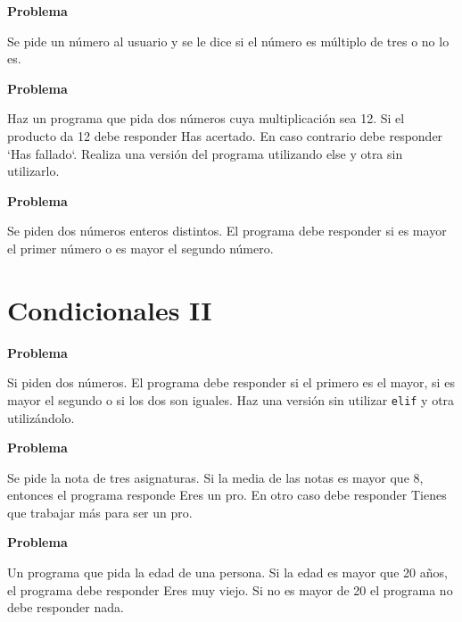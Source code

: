 \documentclass[a4paper, 11pt]{scrartcl}
\begin{document}
\noindent\textbf{\sffamily Problema}

Se pide un número al usuario y se le dice si el número es múltiplo de tres o no lo es.







\noindent\textbf{\sffamily Problema}

Haz un programa que pida dos números cuya multiplicación sea 12. Si el producto da 12 debe responder \guillemotleft Has acertado\guillemotright. En caso contrario debe responder `Has fallado`. Realiza una versión del programa utilizando \guillemotleft else\guillemotright{}  y otra sin utilizarlo.






\noindent\textbf{\sffamily Problema}

Se piden dos números enteros distintos. El programa debe responder si es mayor el primer número o es mayor el segundo número.


\newpage

\section{Condicionales II}





\noindent\textbf{\sffamily Problema}


Si piden dos números. El programa debe responder si el primero es el mayor, si es mayor el segundo o si los dos son iguales. Haz una versión sin utilizar \verb|elif| y otra utilizándolo.






\noindent\textbf{\sffamily Problema}

Se pide la nota de tres asignaturas. Si la media de las notas es mayor que 8, entonces el programa responde \guillemotleft Eres un pro\guillemotright. En otro caso debe responder \guillemotleft Tienes que trabajar más para ser un pro\guillemotright.






\noindent\textbf{\sffamily Problema}

Un programa que pida la edad de una persona. Si la edad es mayor que 20 años, el programa debe responder \guillemotleft Eres muy viejo\guillemotright. Si no es mayor de 20 el programa no debe responder nada.
\end{document}
